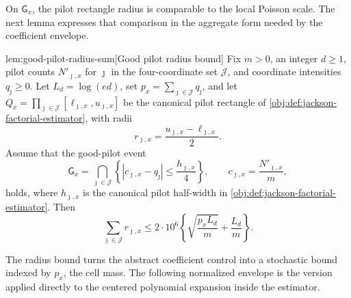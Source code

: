 On \(\mathsf G_x\), the pilot rectangle radius is comparable to the local Poisson scale. The next lemma expresses that comparison in the aggregate form needed by the coefficient envelope.

\begin{lemmav}{lem:good-pilot-radius-sum}[Good pilot radius bound]
Fix \(m>0\), an integer \(d\ge 1\), pilot counts \(N'_{\jmath,x}\) for \(\jmath\) in the four-coordinate set \(\mathcal J\), and coordinate intensities \(q_\jmath\ge 0\).  Let \(L_d=\log(ed)\), set \(p_x=\sum_{\jmath\in\mathcal J}q_\jmath\), and let \(Q_x=\prod_{\jmath\in\mathcal J}[\ell_{\jmath,x},u_{\jmath,x}]\) be the canonical pilot rectangle of \cref{obj:def:jackson-factorial-estimator}, with radii
\[
r_{\jmath,x}=\frac{u_{\jmath,x}-\ell_{\jmath,x}}{2}.
\]
Assume that the good-pilot event
\[
\mathsf G_x=\bigcap_{\jmath\in\mathcal J}
\left\{\left|c_{\jmath,x}-q_\jmath\right|\le \frac{h_{\jmath,x}}{4}\right\},
\qquad c_{\jmath,x}=\frac{N'_{\jmath,x}}{m},
\]
holds, where \(h_{\jmath,x}\) is the canonical pilot half-width in \cref{obj:def:jackson-factorial-estimator}.  Then
\[
\sum_{\jmath\in\mathcal J} r_{\jmath,x}
\le
2\cdot 10^6
\left\{
\sqrt{\frac{p_x L_d}{m}}+\frac{L_d}{m}
\right\}.
\]
\end{lemmav}

The radius bound turns the abstract coefficient control into a stochastic bound indexed by \(p_x\), the cell mass. The following normalized envelope is the version applied directly to the centered polynomial expansion inside the estimator.

